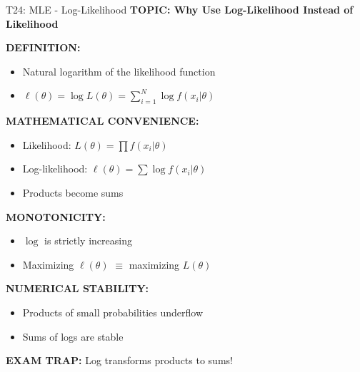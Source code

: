 \documentclass[8pt]{beamer}
\begin{document}
	\begin{frame}{T24: MLE - Log-Likelihood}
		\fontsize{6.5}{7.5}\selectfont
		\textbf{TOPIC: Why Use Log-Likelihood Instead of Likelihood}
		
		\vspace{0.1cm}
		\textbf{DEFINITION:}
		\begin{itemize}
			\item Natural logarithm of the likelihood function
			\item $\ell(\theta) = \log L(\theta) = \sum_{i=1}^N \log f(x_i|\theta)$
		\end{itemize}
		
		\vspace{0.1cm}
		\textbf{MATHEMATICAL CONVENIENCE:}
		\begin{itemize}
			\item Likelihood: $L(\theta) = \prod f(x_i|\theta)$
			\item Log-likelihood: $\ell(\theta) = \sum \log f(x_i|\theta)$
			\item Products become sums
		\end{itemize}
		
		\vspace{0.1cm}
		\textbf{MONOTONICITY:}
		\begin{itemize}
			\item $\log$ is strictly increasing
			\item Maximizing $\ell(\theta)$ $\equiv$ maximizing $L(\theta)$
		\end{itemize}
		
		\vspace{0.1cm}
		\textbf{NUMERICAL STABILITY:}
		\begin{itemize}
			\item Products of small probabilities underflow
			\item Sums of logs are stable
		\end{itemize}
		
		\textcolor{myred}{\textbf{EXAM TRAP:}} Log transforms \textcolor{myblue}{products to sums}!
	\end{frame}
	
\end{document}
